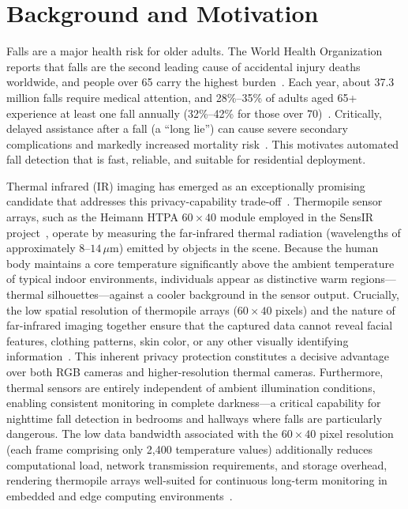 \section{Background and Motivation}
\label{sec:intro_background}

Falls are a major health risk for older adults. The World Health Organization reports that falls are the second leading cause of accidental injury deaths worldwide, and people over 65 carry the highest burden~\cite{who2007falls}. Each year, about 37.3 million falls require medical attention, and 28\%--35\% of adults aged 65+ experience at least one fall annually (32\%--42\% for those over 70)~\cite{tinetti1988risk,lord2007falls}. Critically, delayed assistance after a fall (a ``long lie'') can cause severe secondary complications and markedly increased mortality risk~\cite{wild2004unintentional,Fleming2008inability}. This motivates automated fall detection that is fast, reliable, and suitable for residential deployment.

Thermal infrared (IR) imaging has emerged as an exceptionally promising candidate that addresses this privacy-capability trade-off~\cite{vadivelu2016thermal, nogas2020fall}. Thermopile sensor arrays, such as the Heimann HTPA $60 \times 40$ module employed in the SensIR project~\cite{heimann2024htpa}, operate by measuring the far-infrared thermal radiation (wavelengths of approximately $8$--$14\,\mu$m) emitted by objects in the scene. Because the human body maintains a core temperature significantly above the ambient temperature of typical indoor environments, individuals appear as distinctive warm regions---thermal silhouettes---against a cooler background in the sensor output. Crucially, the low spatial resolution of thermopile arrays ($60 \times 40$ pixels) and the nature of far-infrared imaging together ensure that the captured data cannot reveal facial features, clothing patterns, skin color, or any other visually identifying information~\cite{mashiyama2015activity, tao2018real}. This inherent privacy protection constitutes a decisive advantage over both RGB cameras and higher-resolution thermal cameras. Furthermore, thermal sensors are entirely independent of ambient illumination conditions, enabling consistent monitoring in complete darkness---a critical capability for nighttime fall detection in bedrooms and hallways where falls are particularly dangerous. The low data bandwidth associated with the $60 \times 40$ pixel resolution (each frame comprising only 2,400 temperature values) additionally reduces computational load, network transmission requirements, and storage overhead, rendering thermopile arrays well-suited for continuous long-term monitoring in embedded and edge computing environments~\cite{heimann2024htpa}.

